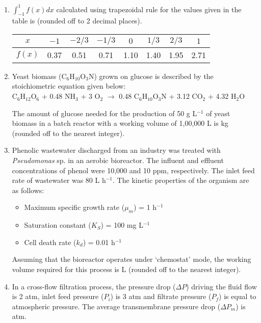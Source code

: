 \documentclass[12pt]{article}
\begin{document}
\begin{enumerate}[label=Q.\arabic*,start=26]
	\item $\int_{-1}^{1} f(x) dx$ calculated using trapezoidal rule for the values given in the table is \underline{\hspace{2cm}} (rounded off to 2 decimal places).

		\begin{center}
			\begin{tabular}{|c|c|c|c|c|c|c|c|}
				\hline
				$x$ & $-1$ & $-2/3$ & $-1/3$ & $0$ & $1/3$ & $2/3$ & $1$ \\
				\hline
				$f(x)$ & 0.37 & 0.51 & 0.71 & 1.10 & 1.40 & 1.95 & 2.71 \\
				\hline
			\end{tabular}
		\end{center}

	\item Yeast biomass (C$_6$H$_{10}$O$_3$N) grown on glucose is described by the stoichiometric equation given below: \\
		C$_6$H$_{12}$O$_6$ + 0.48 NH$_3$ + 3 O$_2$ $\rightarrow$ 0.48 C$_6$H$_{10}$O$_3$N + 3.12 CO$_2$ + 4.32 H$_2$O

		The amount of glucose needed for the production of 50 g L$^{-1}$ of yeast biomass in a batch reactor with a working volume of 1,00,000 L is \underline{\hspace{2cm}} kg (rounded off to the nearest integer).

	\item Phenolic wastewater discharged from an industry was treated with \textit{Pseudomonas} sp. in an aerobic bioreactor. The influent and effluent concentrations of phenol were 10,000 and 10 ppm, respectively. The inlet feed rate of wastewater was 80 L h$^{-1}$. The kinetic properties of the organism are as follows:

		\begin{itemize}
			\item Maximum specific growth rate ($\mu_m$) = 1 h$^{-1}$
			\item Saturation constant ($K_S$) = 100 mg L$^{-1}$
			\item Cell death rate ($k_d$) = 0.01 h$^{-1}$
		\end{itemize}

		Assuming that the bioreactor operates under ‘chemostat’ mode, the working volume required for this process is \underline{\hspace{2cm}} L (rounded off to the nearest integer).
	\item In a cross-flow filtration process, the pressure drop ($\Delta P$) driving the fluid flow is 2 atm, inlet feed pressure ($P_i$) is 3 atm and filtrate pressure ($P_f$) is equal to atmospheric pressure. The average transmembrane pressure drop ($\Delta P_m$) is \underline{\hspace{2cm}} atm.


\end{enumerate}
\end{document}
